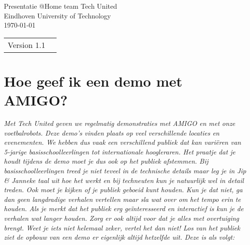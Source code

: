 \documentclass[a4paper,10pt]{article}
\numberwithin{equation}{section}
\numberwithin{figure}{section}
\numberwithin{table}{section}
\begin{document}
\begin{titlepage}

\begin{center}
\vspace{15mm}
\end{center}

\begin{figure}[H]
\centering
\end{figure}

\begin{center}
\vspace{10mm}
{\Huge Presentatie @Home team Tech United}\\
\vspace{3mm}
{\Large Eindhoven University of Technology}\\
\vspace{10mm}
\vspace{3mm}
\today
\end{center}

\vfill


\begin{tabular}{l l}
Version 1.1\\
\end{tabular}

\end{titlepage}

\section*{Hoe geef ik een demo met AMIGO?}
\textit{Met Tech United geven we regelmatig demonstraties met AMIGO en met onze voetbalrobots. Deze demo’s vinden plaats op veel verschillende locaties en evenementen. We hebben dus vaak een verschillend publiek dat kan vari\"eren van 5-jarige basisschoolleerlingen tot internationale hoogleraren. Het praatje dat je houdt tijdens de demo moet je dus ook op het publiek afstemmen. Bij basisschoolleerlingen treed je niet teveel in de technische details maar leg je in Jip \& Janneke taal uit hoe het werkt en bij techneuten kun je natuurlijk wel in detail treden. Ook moet je kijken of je publiek geboeid kunt houden. Kun je dat niet, ga dan geen langdradige verhalen vertellen maar sla wat over om het tempo erin te houden. Als je merkt dat het publiek erg ge\"interesseerd en interactief is kun je de verhalen wat langer houden. Zorg er ook altijd voor dat je alles met overtuiging brengt. Weet je iets niet helemaal zeker, vertel het dan niet! Los van het publiek ziet de opbouw van een demo er eigenlijk altijd hetzelfde uit. Deze is als volgt:}
\end{document}
